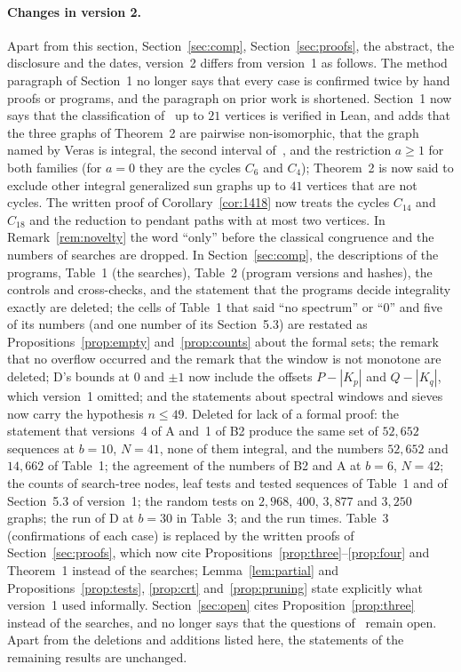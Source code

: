 \documentclass[11pt]{article}
\theoremstyle{definition}
\theoremstyle{remark}
\begin{document}
\paragraph{Changes in version 2.}
Apart from this section, Section~\ref{sec:comp}, Section~\ref{sec:proofs}, the
abstract, the disclosure and the dates, version~2 differs from version~1 as
follows. The method paragraph of Section~1 no longer says that every case is
confirmed twice by hand proofs or programs, and the paragraph on prior work is
shortened. Section~1 now says that the classification of~\cite{brt} up to
$21$ vertices is verified in Lean, and adds that the three graphs of Theorem~2 are pairwise
non-isomorphic, that the graph named by Veras is integral, the second interval
of~\cite[Theorem~2.1]{bms}, and the restriction $a\ge1$ for both families
(for $a=0$ they are the cycles $C_6$ and $C_4$); Theorem~2 is now said to
exclude other integral generalized sun graphs up to $41$ vertices that are not
cycles. The written proof of Corollary~\ref{cor:1418} now treats the cycles
$C_{14}$ and $C_{18}$ and the reduction to pendant paths with at most two
vertices. In Remark~\ref{rem:novelty} the word ``only'' before the classical
congruence and the numbers of searches are dropped. In Section~\ref{sec:comp},
the descriptions of the programs, Table~1 (the searches), Table~2 (program
versions and hashes), the controls and cross-checks, and the statement that the
programs decide integrality exactly are deleted; the cells of Table~1 that
said ``no spectrum'' or ``0'' and five of its numbers (and one number of its Section~5.3) are restated as
Propositions~\ref{prop:empty} and~\ref{prop:counts} about the formal sets; the
remark that no overflow occurred and the remark that the window is not
monotone are deleted; D's bounds at $0$ and $\pm1$ now include the offsets
$P-|K_p|$ and $Q-|K_q|$, which version~1 omitted; and the statements about
spectral windows and sieves now carry the hypothesis $n\le49$. Deleted for lack
of a formal proof: the statement that versions~4 of A and~1 of B2 produce the
same set of $52{,}652$ sequences at $b=10$, $N=41$, none of them integral, and
the numbers $52{,}652$ and $14{,}662$ of Table~1; the agreement of the
numbers of B2 and A at $b=6$, $N=42$; the counts of search-tree nodes, leaf
tests and tested sequences of Table~1 and of Section~5.3 of version~1; the
random tests on $2{,}968$, $400$, $3{,}877$ and $3{,}250$ graphs; the run of D at
$b=30$ in Table~3; and the run times. Table~3 (confirmations of each case) is
replaced by the written proofs of Section~\ref{sec:proofs}, which now cite
Propositions~\ref{prop:three}--\ref{prop:four} and Theorem~1 instead of the
searches; Lemma~\ref{lem:partial} and Propositions~\ref{prop:tests},
\ref{prop:crt} and~\ref{prop:pruning} state explicitly what version~1 used
informally. Section~\ref{sec:open} cites Proposition~\ref{prop:three} instead
of the searches, and no longer says that the questions of~\cite{bms} remain
open. Apart from the deletions and additions listed here, the
statements of the remaining results are unchanged.
\end{document}
